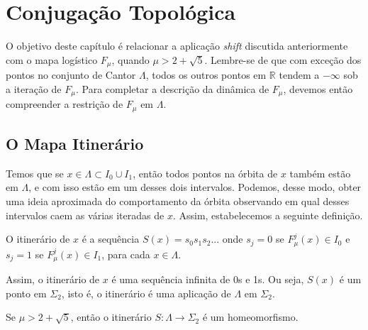 \documentclass[../IC.tex]{subfiles}
\begin{document}
	\chapter{Conjugação Topológica}
	
	O objetivo deste capítulo é relacionar a aplicação \textit{shift} discutida anteriormente com o mapa logístico $F_\mu$, quando $\mu > 2 + \sqrt{5}$. Lembre-se de que com exceção dos pontos no conjunto de Cantor $\Lambda$, todos os outros pontos em $\mathbb{R}$ tendem a $-\infty$ sob a iteração de $F_\mu$. Para completar a descrição da dinâmica de $F_\mu$, devemos então compreender a restrição de $F_\mu$ em $\Lambda$.
	
	\section{O Mapa Itinerário}
	
	Temos que se $x\in \Lambda \subset I_0 \cup I_1$, então todos pontos na órbita de $x$ também estão em $\Lambda$, e com isso estão em um desses dois intervalos. Podemos, desse modo, obter uma ideia aproximada do comportamento da órbita observando em qual desses intervalos caem as várias iteradas de $x$. Assim, estabelecemos a seguinte definição.
	
	\begin{definicao}
		O itinerário de $x$ é a sequência $S(x) = s_0s_1s_2...$ onde $s_j = 0$ se $F_\mu^j(x) \in I_0$ e $s_j = 1$ se $F_\mu^j(x) \in I_1$, para cada $x \in \Lambda$.
	\end{definicao}
	
	Assim, o itinerário de $x$ é uma sequência infinita de 0s e 1s. Ou seja, $S(x)$ é um ponto em $\Sigma_2$, isto é, o itinerário é uma aplicação de $\Lambda$ em $\Sigma_2$.
	
	\begin{teorema}
		Se $\mu > 2+\sqrt{5}$, então o itinerário $S: \Lambda \rightarrow \Sigma_2$ é um homeomorfismo.
	\end{teorema}
	
\end{document}
